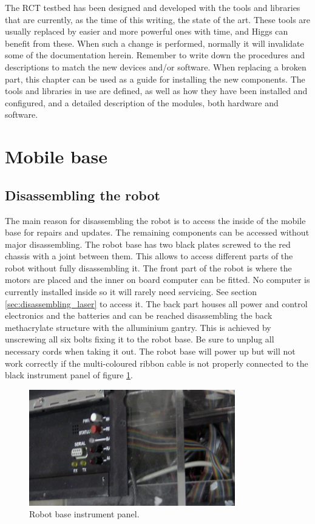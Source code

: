 The RCT testbed has been designed and developed with the tools and libraries that are currently, as
the time of this writing, the state of the art. These tools are usually replaced by easier and more
powerful ones with time, and Higgs can benefit from these. When such a change is performed, normally
it will invalidate some of the documentation herein. Remember to write down the procedures and
descriptions to match the new devices and/or software.
When replacing a broken part, this chapter can be used as a guide for installing the new components.
The tools and libraries
in use are defined, as well as how they have been installed and configured, and a detailed description of the modules,
both hardware
and software.


\section{Mobile base}
\label{sec:devmanual_base}

\subsection{Disassembling the robot}
The main reason for disassembling the robot is to access the inside of the mobile base for repairs and updates. The remaining components can be accessed without major disassembling. The robot base has two black plates screwed to the red chassis with  a joint between them. This allows to access different parts of the robot without fully disassembling it. The front part of the robot is where the motors are placed and the inner on board computer can be fitted. No computer is currently installed inside so it will rarely need servicing. See section \ref{sec:disassembling_laser} to access it. The back part houses all power and control electronics and the batteries and can be reached disassembling the back methacrylate structure with the alluminium gantry. This is achieved by unscrewing all six bolts fixing it to the robot base. Be sure to unplug all necessary cords when taking it out. The robot base will power up but will not work correctly if the  multi-coloured ribbon cable is not properly connected to the black instrument panel of figure \ref{fig:photo_converter}.
\begin{figure}[ht]
\centering
 \includegraphics[width=0.8\textwidth]{figures/device_photos/multicolour_cable.jpg}
\caption{Robot base instrument panel.}
\label{fig:photo_converter}
\end{figure}


